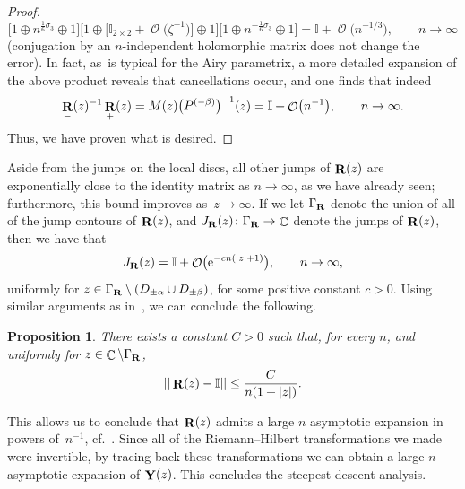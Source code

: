 \documentclass[10pt,a4paper]{amsart}
\DeclareMathOperator{\CC}{\mathbb{C}}
\DeclareMathOperator{\OO}{\mathcal{O}}
\DeclareMathOperator{\YY}{{\bf Y}}
\DeclareMathOperator{\boldR}{{\bf R}}
\numberwithin{equation}{section}
\newtheorem{Proposition}[Theorem]{Proposition}
 { \theoremstyle{definition}
\newtheorem{Definition}[Theorem]{Definition}
\newtheorem{Note}[Theorem]{Note}
\newtheorem{Example}[Theorem]{Example}
\newtheorem{Remark}[Theorem]{Remark} }
\begin{document}
\begin{proof}
 \begin{equation*}
 \bigl[1\oplus n^{\frac{1}{6}\sigma_3}\oplus 1\bigr] \bigl[1\oplus\bigl[\mathbb{I}_{2\times 2} + \OO\bigl(\zeta^{-1}\bigr)\bigr]\oplus 1\bigr]\bigl[1\oplus n^{-\frac{1}{6}\sigma_3}\oplus 1\bigr] = \mathbb{I} + \OO\bigl(n^{-1/3}\bigr), \qquad n\to \infty
 \end{equation*}
 (conjugation by an $n$-independent holomorphic matrix does not change the error). In fact, as~is typical for the Airy parametrix, a more detailed expansion of the above product reveals that cancellations occur, and one finds that indeed
 \begin{equation*}
 \boldR_-(z)^{-1}\boldR_+(z) = M(z) \bigl(P^{(-\beta)}\bigr)^{-1}(z) = \mathbb{I} + \OO\bigl(n^{-1}\bigr),\qquad n\to \infty.
 \end{equation*}
 Thus, we have proven what is desired.
\end{proof}

Aside from the jumps on the local discs, all other jumps of $\boldR(z)$ are exponentially close to the identity matrix as $n\to \infty$, as we have already seen; furthermore, this bound improves as~${z\to \infty}$. If we let $\Gamma_{\boldR}$ denote the union of all of the jump contours of $\boldR(z)$, and $J_{\boldR}(z)\colon \Gamma_{\boldR} \to \CC$ denote the jumps of $\boldR(z)$, then we have that
 \begin{equation*}
 J_{\boldR}(z) = \mathbb{I} + \OO\bigl({\rm e}^{-cn(|z|+1)}\bigr), \qquad n\to\infty,
 \end{equation*}
uniformly for $z\in \Gamma_{\boldR} \setminus \left(D_{\pm\alpha}\cup D_{\pm\beta}\right)$, for some positive constant $c>0$. Using similar arguments as in~\cite{DK1,DKM}, we can conclude the following.

\begin{Proposition}
 There exists a constant $C>0$ such that, for every $n$, and uniformly for ${z\in \CC\setminus \Gamma_{\boldR}}$,
 \begin{equation*}
 ||\boldR(z)-\mathbb{I}|| \leq \frac{C}{n(1+|z|)}.
 \end{equation*}
\end{Proposition}
This allows us to conclude that $\boldR(z)$ admits a large $n$ asymptotic expansion in powers of~$n^{-1}$, cf.~\cite[Theorem 7.10]{DKMVZ}. Since all of the Riemann--Hilbert transformations we made were invertible, by tracing back these transformations we can obtain a large $n$ asymptotic expansion of $\YY(z)$. This concludes the steepest descent analysis.
\end{document}
